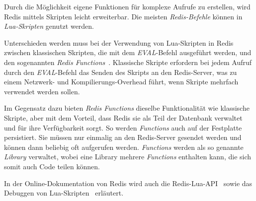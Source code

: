 Durch die Möglichkeit eigene Funktionen für komplexe Aufrufe zu erstellen, wird Redis mittels Skripten leicht erweiterbar. Die meisten \emph{Redis-Befehle} können in \emph{Lua-Skripten} genutzt werden.

Unterschieden werden muss bei der Verwendung von Lua-Skripten in Redis zwischen klassischen Skripten, die mit dem \emph{EVAL}-Befehl ausgeführt werden, und den sogenannten \emph{Redis Functions}~\cite{redis_ltd_redis_nodate-1}. Klassische Skripte erfordern bei jedem Aufruf durch den \emph{EVAL}-Befehl das Senden des Skripts an den Redis-Server, was zu einem Netzwerk- und Kompilierungs-Overhead führt, wenn Skripte mehrfach verwendet werden sollen.

Im Gegensatz dazu bieten \emph{Redis Functions} dieselbe Funktionalität wie klassische Skripte, aber mit dem Vorteil, dass Redis sie als Teil der Datenbank verwaltet und für ihre Verfügbarkeit sorgt.  So werden \emph{Functions} auch auf der Festplatte persistiert. Sie müssen nur einmalig an den Redis-Server gesendet werden und können dann beliebig oft aufgerufen werden. \Die \emph{Functions} werden als so genannte \emph{Library} verwaltet, wobei eine Library mehrere \emph{Functions} enthalten kann, die sich somit auch Code teilen können.

In der Online-Dokumentation von Redis wird auch die Redis-Lua-API~\cite{redis_ltd_redis_nodate} sowie das Debuggen von Lua-Skripten~\cite{redis_ltd_debugging_nodate} erläutert.

